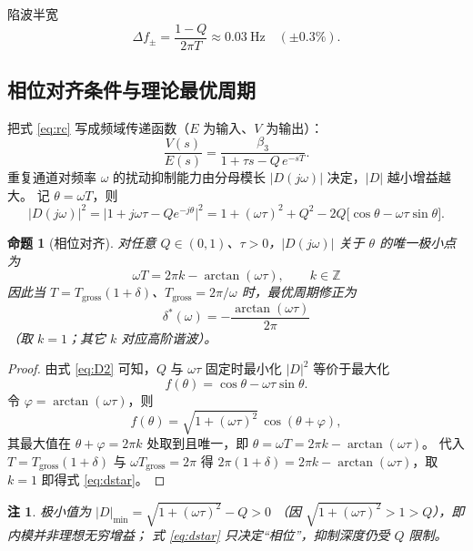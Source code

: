 \documentclass[UTF8,fontset=windows,a4paper,11pt]{ctexart}
\newtheorem{proposition}{命题}
\newtheorem{remark}{注}
\newcommand{\Tg}{T_{\mathrm{gross}}}
\begin{document}
陷波半宽
\begin{equation}
\Delta f_{\pm}=\frac{1-Q}{2\pi T}\approx 0.03\ \mathrm{Hz}\quad(\pm0.3\%).
\end{equation}

\subsection{相位对齐条件与理论最优周期}

把式 \eqref{eq:rc} 写成频域传递函数（$E$ 为输入、$V$ 为输出）：
\begin{equation}
\frac{V(s)}{E(s)}=\frac{\beta_3}{1+\tau s-Q\,e^{-sT}} .
\label{eq:rc_tf}
\end{equation}
重复通道对频率 $\omega$ 的扰动抑制能力由分母模长 $|D(j\omega)|$ 决定，$|D|$ 越小增益越大。
记 $\theta=\omega T$，则
\begin{equation}
\big|D(j\omega)\big|^2=\big|1+j\omega\tau-Qe^{-j\theta}\big|^2
=1+(\omega\tau)^2+Q^2-2Q\big[\cos\theta-\omega\tau\sin\theta\big].
\label{eq:D2}
\end{equation}

\begin{proposition}[相位对齐]
对任意 $Q\in(0,1)$、$\tau>0$，$|D(j\omega)|$ 关于 $\theta$ 的唯一极小点为
\begin{equation}
\boxed{\;\omega T=2\pi k-\arctan(\omega\tau),\qquad k\in\mathbb{Z}\;}
\label{eq:phase}
\end{equation}
因此当 $T=\Tg(1+\delta)$、$\Tg=2\pi/\omega$ 时，最优周期修正为
\begin{equation}
\boxed{\;\delta^{*}(\omega)=-\frac{\arctan(\omega\tau)}{2\pi}\;}
\label{eq:dstar}
\end{equation}
（取 $k=1$；其它 $k$ 对应高阶谐波）。
\end{proposition}

\begin{proof}
由式 \eqref{eq:D2} 可知，$Q$ 与 $\omega\tau$ 固定时最小化 $|D|^2$ 等价于最大化
\[
f(\theta)=\cos\theta-\omega\tau\sin\theta .
\]
令 $\varphi=\arctan(\omega\tau)$，则
\[
f(\theta)=\sqrt{1+(\omega\tau)^2}\,\cos(\theta+\varphi),
\]
其最大值在 $\theta+\varphi=2\pi k$ 处取到且唯一，即
$\theta=\omega T=2\pi k-\arctan(\omega\tau)$。
代入 $T=\Tg(1+\delta)$ 与 $\omega\Tg=2\pi$ 得
$2\pi(1+\delta)=2\pi k-\arctan(\omega\tau)$，取 $k=1$ 即得式 \eqref{eq:dstar}。
\end{proof}

\begin{remark}
极小值为 $\big|D\big|_{\min}=\sqrt{1+(\omega\tau)^2}-Q>0$
（因 $\sqrt{1+(\omega\tau)^2}>1>Q$），即内模并非理想无穷增益；
式 \eqref{eq:dstar} 只决定“相位”，抑制深度仍受 $Q$ 限制。
\end{remark}
\end{document}
